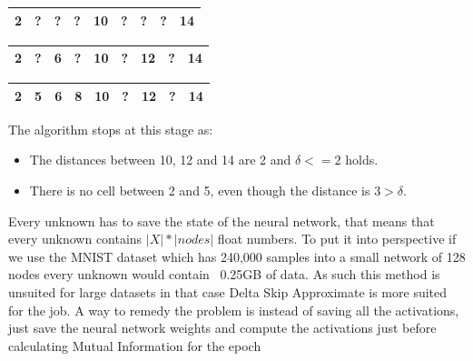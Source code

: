 \documentclass[dissertation.tex]{subfiles}
\begin{document}
  \begin{table}[H]
    \centering
      \begin{tabular}{|c|c|c|c|c|c|c|c|c|}
      \hline			
        2&?&?&?&\bf{10}&?&?&?&14\\
      \hline  
    \end{tabular}
  \end{table}

  \begin{table}[H]
    \centering
      \begin{tabular}{|c|c|c|c|c|c|c|c|c|}
      \hline			
        2&?&\bf{6}&?&10&?&\bf{12}&?&14\\
      \hline  
    \end{tabular}
  \end{table}

  \begin{table}[H]
    \centering
      \begin{tabular}{|c|c|c|c|c|c|c|c|c|}
      \hline			
        2&\bf{5}&6&\bf{8}&10&?&12&?&14\\
      \hline  
    \end{tabular}
  \end{table}

  The algorithm stops at this stage as:
  \begin{itemize}
    \item{
        The distances between 10, 12 and 14 are 2 and $\delta <= 2$ holds.
      }
    \item{
        There is no cell between 2 and 5, even though the distance is $3 >
        \delta$.
      }
  \end{itemize}

  Every unknown has to save the state of the neural network, that means that
  every unknown contains $|X|*|nodes|$ float numbers. To put it into perspective
  if we use the MNIST dataset which has 240,000 samples into a small network of
  128 nodes every unknown would contain ~0.25GB of data. As such this method is
  unsuited for large datasets in that case Delta Skip Approximate is more suited
  for the job. A way to remedy the problem is instead of saving all the
  activations, just save the neural network weights and compute the activations
  just before calculating Mutual Information for the epoch
  
\end{document}
